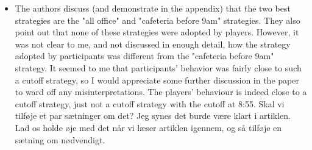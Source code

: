\documentclass[a4paper]{article}
\newenvironment{response}{\smallskip \noindent \color{blue}}{\color{black}\smallskip}
\newenvironment{tobo}{\smallskip \noindent \color{yellow!80!black!80}}{\color{black}\smallskip}
\begin{document}
\begin{itemize}
 \item The authors discuss (and demonstrate in the appendix) that the two best strategies are the "all office" and "cafeteria before 9am" strategies. They also point out that none of these strategies were adopted by players. However, it was not clear to me, and not discussed in enough detail, how the strategy adopted by participants was different from the "cafeteria before 9am" strategy. It seemed to me that participants' behavior was fairly close to such a cutoff strategy, so I would appreciate some further discussion in the paper to ward off any misinterpretations.
 \begin{response}
 The players' behaviour is indeed close to a cutoff strategy, just not a cutoff strategy with the cutoff at 8:55. 
 \end{response}
 \begin{tobo}
 Skal vi tilføje et par sætninger om det? Jeg synes det burde være klart i artiklen. Lad os holde øje med det når vi læser artiklen igennem, og så tilføje en sætning om nødvendigt.
 \end{tobo}
 
\end{itemize}
\end{document}
